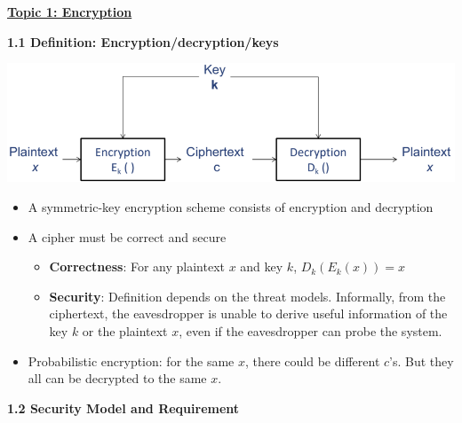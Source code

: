 \documentclass[landscape,a4paper]{extarticle}
\newenvironment{Figure}
  {\par\noindent\minipage{\linewidth}}
  {\endminipage\par\medskip}
\begin{document}
\begin{multicols*}{5}
    \textbf{\uline{Topic 1: Encryption}}

    \textbf{1.1 Definition: Encryption/decryption/keys}

    \begin{Figure}
        \centering
        \includegraphics[width=\linewidth]{symmetric_key_encryption.png}
    \end{Figure}

    \begin{itemize}
        \item A symmetric-key encryption scheme consists of encryption and decryption
        \item A cipher must be correct and secure
        \begin{itemize}
            \item \textbf{Correctness}: For any plaintext $x$ and key $k$, $D_k(E_k(x)) = x$
            \item \textbf{Security}: Definition depends on the threat models. Informally,
            from the ciphertext, the eavesdropper is unable to derive useful information of the
            key $k$ or the plaintext $x$, even if the eavesdropper can probe the system.
        \end{itemize}
        \item Probabilistic encryption: for the same $x$, there could be different $c$'s.
        But they all can be decrypted to the same $x$.
    \end{itemize}


    \textbf{1.2 Security Model and Requirement}
    

\end{multicols*}
\end{document}
